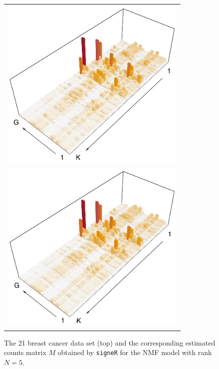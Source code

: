\documentclass[11pt]{amsart}
\theoremstyle{definition}
\begin{document}

\begin{center}
\begin{figure}
 \begin{tabular}{c}
 \includegraphics[width=9cm]{sfigs/21_Breast_Cancer_3D_M} 
 \\
 \includegraphics[width=9cm]{sfigs/21_Breast_Cancer_3D_Mhat} 
 \end{tabular}
 \caption{The 21 breast cancer data set (top) and the corresponding 
   estimated counts matrix $M$ obtained by \texttt{signeR} for the NMF
   model with rank $N=5$.
 }\label{fig:bcancerDATA}
\end{figure}
\end{center}
\end{document}
